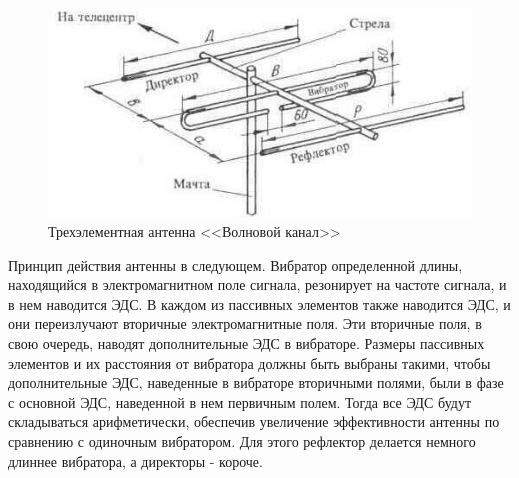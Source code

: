 \begin{figure}[H]
    \centering
    \includegraphics[width=.9\textwidth]{img/uda-yagi.jpg}
    \caption{Трехэлементная антенна <<Волновой канал>>}
\end{figure}

Принцип действия антенны в следующем. Вибратор определенной длины, находящийся в электромагнитном поле сигнала, резонирует на частоте сигнала, и в нем наводится ЭДС. В каждом из пассивных элементов также наводится ЭДС, и они переизлучают вторичные электромагнитные поля. Эти вторичные поля, в свою очередь, наводят дополнительные ЭДС в вибраторе. Размеры пассивных элементов и их расстояния от вибратора должны быть выбраны такими, чтобы дополнительные ЭДС, наведенные в вибраторе вторичными полями, были в фазе с основной ЭДС, наведенной в нем первичным полем. Тогда все ЭДС будут складываться арифметически, обеспечив увеличение эффективности антенны по сравнению с одиночным вибратором. Для этого рефлектор делается немного длиннее вибратора, а директоры - короче.
